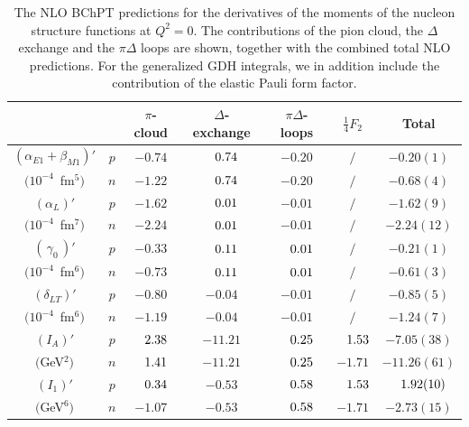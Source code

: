 \documentclass[twocolumn,prc,showpacs,nofootinbib,preprintnumbers,amsmath,amssymb,superscriptaddress]{revtex4-1}
\def\hpm{\hphantom{-}}
\def\quarter{\mbox{$\frac{1}{4}$}}
\begin{document}
\begin{table}[tb]
\begin{tabular}{cc|c|c|c|c|c|}
\cline{3-7} 
&& $\pi$-cloud & $\Delta$-exchange   & $\pi\Delta$-loops & $\quarter F_2$ & Total \\
\hline
\multicolumn{1}{|c||}{$(\alpha_{E1}+\beta_{M1})'$} &$p$&$-0.74$&$\hpm0.74$&$-0.20$&$/$&$-0.20(1)$\\
\multicolumn{1}{|c||}{$(10^{-4}$~fm$^5)$} &$n$&$-1.22$&$\hpm0.74$&$-0.20$&$/$&$-0.68(4)$\\
\hline
\multicolumn{1}{|c||}{$(\alpha_L)'$}&$p$ &$-1.62$&$\hpm0.01$&$-0.01$&$/$&$-1.62(9)$\\
\multicolumn{1}{|c||}{$(10^{-4}$~fm$^7)$} &$n$&$-2.24$&$\hpm0.01$&$-0.01$&$/$&$-2.24(12)$\\
\hline
\multicolumn{1}{|c||}{$(\,\gamma_0 \,)'$}&$p$ &$-0.33$&$\hpm0.11$&$\hpm0.01$&$/$&$-0.21(1)$\\
\multicolumn{1}{|c||}{$(10^{-4}$~fm$^6)$} &$n$&$-0.73$&$\hpm0.11$&$\hpm0.01$&$/$&$-0.61(3)$\\
\hline
\multicolumn{1}{|c||}{$(\delta_{LT})'$}&$p$&$-0.80$&$-0.04$&$-0.01$&$/$&$-0.85(5)$\\
\multicolumn{1}{|c||}{$(10^{-4}$~fm$^6)$}&$n$ &$-1.19$&$-0.04$&$-0.01$&$/$&$-1.24(7)$\\
\hline
\multicolumn{1}{|c||}{$(I_A)'$}&$p$ &$\hpm2.38$&$-11.21$&$\hpm0.25$&$\hpm1.53$&$-7.05(38)$\\
\multicolumn{1}{|c||}{$($GeV$^2)$} &$n$&$\hpm1.41$&$-11.21$&$\hpm0.25$&$-1.71$&$-11.26(61)$\\
\hline
\multicolumn{1}{|c||}{$(I_1)'$}&$p$&$\hpm0.34$&$-0.53$&$\hpm0.58$&$\hpm1.53$&$\hpm1.92(10)$\\
\multicolumn{1}{|c||}{$($GeV$^6)$}&$n$ &$-1.07$&$-0.53$&$\hpm0.58$&$-1.71$&$-2.73(15)$\\
\hline
\end{tabular}
\caption{The NLO BChPT predictions for the derivatives of the moments of the nucleon structure functions at $Q^2=0$. The contributions of the pion cloud, the $\Delta$ exchange and the $\pi\Delta$ loops are shown, together with the combined total NLO predictions. For the generalized GDH integrals, we in addition include the contribution of the elastic Pauli form factor.
\label{Table:Results-DerPol}}
\end{table}
\end{document}
